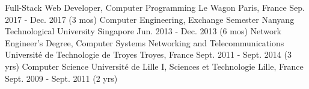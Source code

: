 
\begin{cventries}

  \cventry
    {Full-Stack Web Developer, Computer Programming} %
    {Le Wagon} %
    {Paris, France} %
    {Sep. 2017 - Dec. 2017 (3 mos)} %
    {}
  \cventry
    {Computer Engineering, Exchange Semester} %
    {Nanyang Technological University} %
    {Singapore} %
    {Jun. 2013 - Dec. 2013 (6 mos)} %
    {}
  \cventry
    {Network Engineer's Degree, Computer Systems Networking and Telecommunications} %
    {Université de Technologie de Troyes} %
    {Troyes, France} %
    {Sept. 2011 - Sept. 2014 (3 yrs)} %
    {}
  \cventry
    {Computer Science} %
    {Université de Lille I, Sciences et Technologie} %
    {Lille, France} %
    {Sept. 2009 - Sept. 2011 (2 yrs)} %
    {}
\end{cventries}
